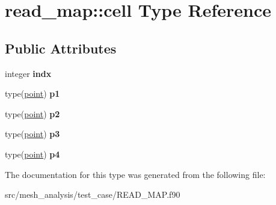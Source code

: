 \hypertarget{structread__map_1_1cell}{\section{read\-\_\-map\-:\-:cell Type Reference}
\label{structread__map_1_1cell}
}
\subsection*{Public Attributes}
\begin{DoxyCompactItemize}
\item 
\hypertarget{structread__map_1_1cell_aac3c2e254c3d91c325600f9a6e2d602a}{integer {\bfseries indx}}\label{structread__map_1_1cell_aac3c2e254c3d91c325600f9a6e2d602a}

\item 
\hypertarget{structread__map_1_1cell_a0580cf5e279ed193870de365a2a3fdf7}{type(\hyperlink{structread__map_1_1point}{point}) {\bfseries p1}}\label{structread__map_1_1cell_a0580cf5e279ed193870de365a2a3fdf7}

\item 
\hypertarget{structread__map_1_1cell_ad1577807c3ac52d15f99013af905bede}{type(\hyperlink{structread__map_1_1point}{point}) {\bfseries p2}}\label{structread__map_1_1cell_ad1577807c3ac52d15f99013af905bede}

\item 
\hypertarget{structread__map_1_1cell_a15ad0a036da594a5c274e7e4d8f3abef}{type(\hyperlink{structread__map_1_1point}{point}) {\bfseries p3}}\label{structread__map_1_1cell_a15ad0a036da594a5c274e7e4d8f3abef}

\item 
\hypertarget{structread__map_1_1cell_a0a8538fb34ba6c0ae71941b0e32f46af}{type(\hyperlink{structread__map_1_1point}{point}) {\bfseries p4}}\label{structread__map_1_1cell_a0a8538fb34ba6c0ae71941b0e32f46af}

\end{DoxyCompactItemize}


The documentation for this type was generated from the following file\-:\begin{DoxyCompactItemize}
\item 
src/mesh\-\_\-analysis/test\-\_\-case/R\-E\-A\-D\-\_\-\-M\-A\-P.\-f90\end{DoxyCompactItemize}
